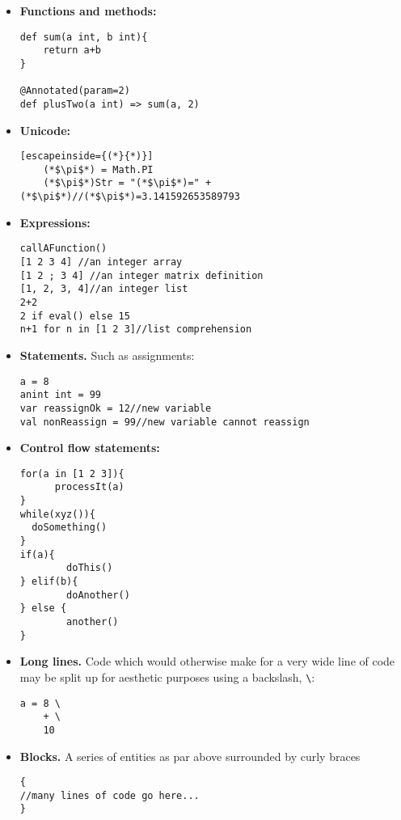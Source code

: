 \documentclass[conc-doc]{subfiles}
\begin{document}
\begin{itemize}
	\item \textbf{Functions and methods:}
	\begin{lstlisting}
def sum(a int, b int){
	return a+b
}

@Annotated(param=2)
def plusTwo(a int) => sum(a, 2)
	\end{lstlisting}
	
	\item \textbf{Unicode:}
	\begin{lstlisting}[escapeinside={(*}{*)}]
	(*$\pi$*) = Math.PI
	(*$\pi$*)Str = "(*$\pi$*)=" + (*$\pi$*)//(*$\pi$*)=3.141592653589793 
	\end{lstlisting}
		
	
	\item \textbf{Expressions:}
	\begin{lstlisting}
callAFunction()
[1 2 3 4] //an integer array
[1 2 ; 3 4] //an integer matrix definition
[1, 2, 3, 4]//an integer list
2+2
2 if eval() else 15
n+1 for n in [1 2 3]//list comprehension
	\end{lstlisting}
	
	\item \textbf{Statements.} Such as assignments:
	\begin{lstlisting}
a = 8
anint int = 99
var reassignOk = 12//new variable
val nonReassign = 99//new variable cannot reassign
	\end{lstlisting}
	
	\item \textbf{Control flow statements:}
	\begin{lstlisting}
for(a in [1 2 3]){
	  processIt(a)
}
while(xyz()){ 
  doSomething() 
} 
if(a){
		doThis()
} elif(b){
		doAnother()
} else {
		another() 
}
	\end{lstlisting}
	
	\item \textbf{Long lines.} Code which would otherwise make for a very wide line of code may be split up for aesthetic purposes using a backslash, \lstinline{\}:
		\begin{lstlisting}
a = 8 \
	+ \
	10
	\end{lstlisting}
	
	\item \textbf{Blocks.} A series of entities as par above surrounded by curly braces {}
\begin{lstlisting}
{
//many lines of code go here...
}	
\end{lstlisting}


\end{itemize}
\end{document}
